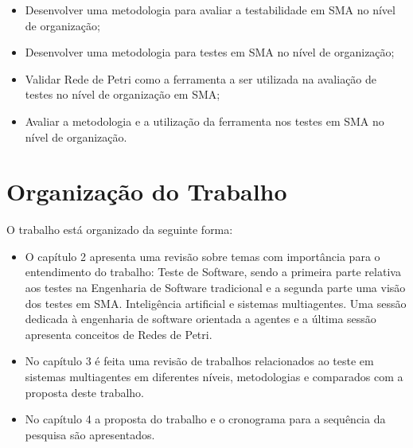 \begin{itemize}

% 
% 
% 
\item Desenvolver uma metodologia para avaliar a testabilidade em SMA no nível de organização;
\item Desenvolver uma metodologia para testes em SMA no nível de organização;
\item Validar Rede de Petri como a ferramenta a ser utilizada na avaliação de testes no nível de organização em SMA;
% 
% 
\item Avaliar a metodologia e a utilização da ferramenta nos testes em SMA no nível de organização.


\end{itemize}


\section{Organização do Trabalho}

O trabalho está organizado da seguinte forma:

\begin{itemize}
\item O capítulo 2 apresenta uma revisão sobre temas com importância para o entendimento do trabalho: Teste de Software, sendo a primeira parte relativa aos testes na Engenharia de Software tradicional e a segunda parte uma visão dos testes em SMA. Inteligência artificial e sistemas multiagentes. Uma sessão dedicada à engenharia de software orientada a agentes e a última sessão apresenta conceitos de Redes de Petri.

\item No capítulo 3 é feita uma revisão de trabalhos relacionados ao teste em sistemas multiagentes em diferentes níveis, metodologias  e comparados com a proposta deste trabalho.

\item No capítulo 4 a proposta do trabalho e o cronograma para a sequência da pesquisa são apresentados.
\end{itemize}

